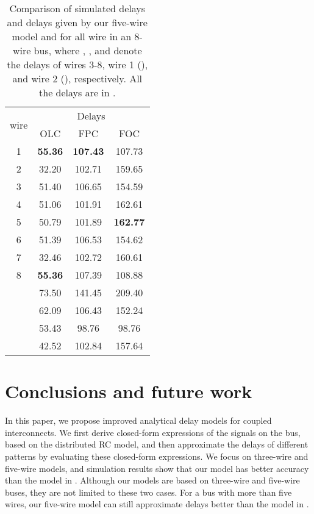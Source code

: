 \documentclass[10pt,journal]{IEEEtran}
\begin{document}
\begin{table}[!t]
\caption{Comparison of simulated delays and delays given by our five-wire model and \cite{Sot01} for all wire in an 8-wire bus, where , , and  denote the delays of wires 3-8, wire 1 (), and wire 2 (), respectively. All the delays are in .}\label{tab:8wire}
\begin{center}
\begin{tabular}{|c|c|c|c|}
\hline
\multirow{2}{*}{wire } & \multicolumn{3}{c|}{Delays}\\
\cline{2-4}
& OLC & FPC& FOC\\
\hline
1 & \textbf{55.36} & \textbf{107.43} & 107.73\\
\hline
2 & 32.20 & 102.71 & 159.65\\
\hline
3 & 51.40 & 106.65 & 154.59\\
\hline
4 & 51.06 & 101.91 & 162.61\\
\hline
5 & 50.79 & 101.89 & \textbf{162.77}\\
\hline
6 & 51.39 & 106.53 & 154.62\\
\hline
7 & 32.46 & 102.72 & 160.61\\
\hline
8 & \textbf{55.36} & 107.39 & 108.88\\
\hline
\hline
\cite{Sot02} & 73.50 & 141.45 & 209.40\\
\hline
 & 62.09 & 106.43 & 152.24\\
\hline
 & 53.43 & 98.76 & 98.76 \\
\hline
 & 42.52 & 102.84 & 157.64\\
\hline
\end{tabular}
\end{center}
\end{table}












\section{Conclusions and future work}\label{sec:conclusion}
In this paper, we propose improved analytical delay models for coupled interconnects. We first derive closed-form expressions of the signals on the bus, based on the distributed RC model, and then approximate the delays of different patterns by evaluating these closed-form expressions. We focus on three-wire and five-wire models, and simulation results show that our model has better accuracy than the model in \cite{Sot01}. Although our models are based on three-wire and five-wire buses, they are not limited to these two cases. For a bus with more than five wires, our five-wire model can still approximate delays better than the model in \cite{Sot01}. 



\end{document}
